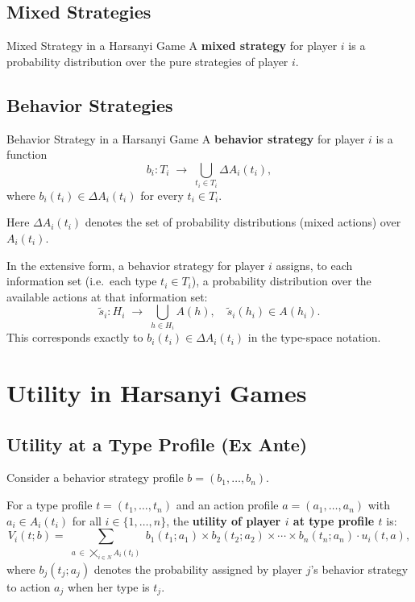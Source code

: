 \documentclass[12pt, a4paper]{article}
\begin{document}
\subsection{Mixed Strategies}

\begin{defbox}{Mixed Strategy in a Harsanyi Game}
A \textbf{mixed strategy} for player $i$ is a probability distribution over the pure strategies of player $i$.
\end{defbox}

\subsection{Behavior Strategies}

\begin{defbox}{Behavior Strategy in a Harsanyi Game}
A \textbf{behavior strategy} for player $i$ is a function
\[
  b_i : T_i \;\longrightarrow\; \bigcup_{t_i \in T_i} \Delta A_i(t_i),
\]
where $b_i(t_i) \in \Delta A_i(t_i)$ for every $t_i \in T_i$.

Here $\Delta A_i(t_i)$ denotes the set of probability distributions (mixed actions) over $A_i(t_i)$.
\end{defbox}

\begin{notebox}
  In the extensive form, a behavior strategy for player $i$ assigns, to each information set (i.e.\ each type $t_i \in T_i$), a probability distribution over the available actions at that information set:
  \[
    \tilde{s}_i : H_i \;\longrightarrow\; \bigcup_{h \in H_i} A(h), \quad \tilde{s}_i(h_i) \in A(h_i).
  \]
  This corresponds exactly to $b_i(t_i) \in \Delta A_i(t_i)$ in the type-space notation.
\end{notebox}

\section{Utility in Harsanyi Games}

\subsection{Utility at a Type Profile (Ex Ante)}

Consider a behavior strategy profile $b = (b_1, \ldots, b_n)$.

For a type profile $t = (t_1, \ldots, t_n)$ and an action profile $a = (a_1, \ldots, a_n)$ with $a_i \in A_i(t_i)$ for all $i \in \{1,\ldots,n\}$, the \textbf{utility of player $i$ at type profile $t$} is:
\[
  V_i(t; b) = \sum_{\substack{a \,\in\, \bigtimes_{i \in N} A_i(t_i)}}
  b_1(t_1; a_1) \times b_2(t_2; a_2) \times \cdots \times b_n(t_n; a_n) \cdot u_i(t, a),
\]
where $b_j(t_j; a_j)$ denotes the probability assigned by player $j$'s behavior strategy to action $a_j$ when her type is $t_j$.
\end{document}
